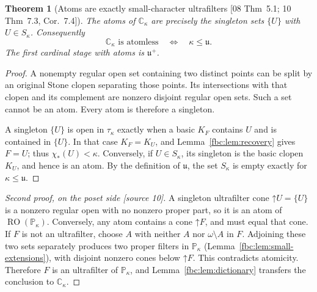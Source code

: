 \documentclass[11pt,letterpaper]{article}
\newtheorem{theorem}{Theorem}[section]
\theoremstyle{definition}
\theoremstyle{remark}
\newcommand{\om}{\omega}
\newcommand{\C}{\mathbb C}
\newcommand{\PP}{\mathbb P}
\newcommand{\cu}{\mathfrak u}
\newcommand{\up}{\mathord{\uparrow}}
\newcommand{\RO}{\operatorname{RO}}
\newcommand{\src}[1]{\textup{[#1]}}
\begin{document}
\begin{theorem}[Atoms are exactly small-character ultrafilters \src{08 Thm~5.1; 10 Thm~7.3, Cor.~7.4}]
\label{fbc:thm:atoms}
The atoms of $\C_\kappa$ are precisely the singleton sets
$\{U\}$ with $U\in S_\kappa$. Consequently
\[
 \C_\kappa\text{ is atomless}\quad\Longleftrightarrow\quad
 \kappa\leq\cu.
\]
The first cardinal stage with atoms is $\cu^+$.
\end{theorem}
\begin{proof}
A nonempty regular open set containing two distinct points can be split
by an original Stone clopen separating those points. Its intersections
with that clopen and its complement are nonzero disjoint regular open
sets. Such a set cannot be an atom. Every atom is therefore a singleton.

A singleton $\{U\}$ is open in $\tau_\kappa$ exactly when a basic
$K_F$ contains $U$ and is contained in $\{U\}$. In that case
$K_F=K_U$, and Lemma~\ref{fbc:lem:recovery} gives $F=U$; thus
$\chi_*(U)<\kappa$. Conversely, if $U\in S_\kappa$, its singleton
is the basic clopen $K_U$, and hence is an atom. By the definition of
$\cu$, the set $S_\kappa$ is empty exactly for $\kappa\leq\cu$.
\end{proof}

\begin{proof}[Second proof, on the poset side \src{source 10}]
A singleton ultrafilter cone $\up U=\{U\}$ is a nonzero regular open with
no nonzero proper part, so it is an atom of $\RO(\PP_\kappa)$. Conversely,
any atom contains a cone $\up F$, and must equal that cone. If $F$ is not
an ultrafilter, choose $A$ with neither $A$ nor $\om\setminus A$ in $F$.
Adjoining these two sets separately produces two proper filters in
$\PP_\kappa$ (Lemma~\ref{fbc:lem:small-extensions}), with disjoint
nonzero cones below $\up F$. This contradicts atomicity. Therefore $F$ is
an ultrafilter of $\PP_\kappa$, and Lemma~\ref{fbc:lem:dictionary}
transfers the conclusion to $\C_\kappa$.
\end{proof}
\end{document}
